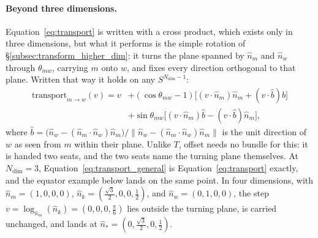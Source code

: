 \documentclass[12pt, a4paper]{article}
\begin{document}
\paragraph{Beyond three dimensions.}
Equation~\eqref{eq:transport} is written with a cross product, which
exists only in three dimensions, but what it performs is the simple
rotation of \S\ref{subsec:transform_higher_dim}: it turns the plane
spanned by $\hat n_m$ and $\hat n_w$ through $\theta_{mw}$, carrying
$m$ onto $w$, and fixes every direction orthogonal to that plane.
Written that way it holds on any $S^{N_{\mathrm{dim}}-1}$:
\begin{equation}
    \begin{aligned}
    \mathrm{transport}_{m\to w}(v)
    = v &+ (\cos\theta_{mw}-1)\bigl[(v\cdot\hat n_m)\hat n_m + (v\cdot\hat b)\hat b\bigr]\\
        &+ \sin\theta_{mw}\bigl[(v\cdot\hat n_m)\hat b - (v\cdot\hat b)\hat n_m\bigr],
    \end{aligned}
    \label{eq:transport_general}
\end{equation}
where $\hat b = \bigl(\hat n_w - (\hat n_m\cdot\hat n_w)\hat n_m\bigr)/
\lVert \hat n_w - (\hat n_m\cdot\hat n_w)\hat n_m\rVert$ is the unit
direction of $w$ as seen from $m$ within their plane.
Unlike $T$, offset needs no bundle for this: it is handed two seats,
and the two seats name the turning plane themselves. At
$N_{\mathrm{dim}}=3$, Equation~\eqref{eq:transport_general} is
Equation~\eqref{eq:transport} exactly, and the equator example below
lands on the same point. In four dimensions, with
$\hat n_m=(1,0,0,0)$, $\hat n_k=(\tfrac{\sqrt3}{2},0,0,\tfrac12)$, and
$\hat n_w=(0,1,0,0)$, the step $v=\log_{\hat n_m}(\hat n_k)
=(0,0,0,\tfrac{\pi}{6})$ lies outside the turning plane, is carried
unchanged, and lands at $\hat n_*=(0,\tfrac{\sqrt3}{2},0,\tfrac12)$.
\end{document}
